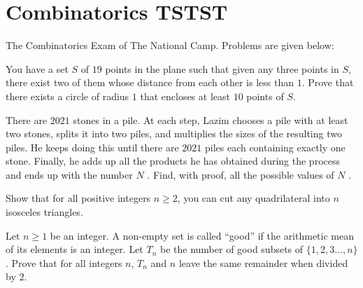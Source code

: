 


\chapter{Combinatorics TSTST}\label{tstst:combi}



%
The Combinatorics Exam of The National Camp.
Problems are given below:

\begin{prob}\label{combi:1}
You have a set $S$ of $19$ points in the plane such that given any three points in $S$, there exist two of them
whose distance from each other is less than $1$. Prove that there exists a circle of radius $1$ that encloses
at least $10$ points of $S$.
	\begin{hint}
	\addhint{}
	\end{hint}
\end{prob}

\begin{prob}\label{combi:2}
There are $2021$ stones in a pile. At each step, Lazim chooses a pile with at least two stones, splits it into
two piles, and multiplies the sizes of the resulting two piles. He keeps doing this until there are $2021$
piles each containing exactly one stone. Finally, he adds up all the products he has obtained during the
process and ends up with the number $N$ . Find, with proof, all the possible values of $N$ .
	\begin{hint}
	\addhint{}
	\addhint{}
	\end{hint}
\end{prob}

\begin{prob}\label{combi:3}
Show that for all positive integers $n\ge 2$, you can cut any quadrilateral into $n$ isosceles triangles.
	\begin{hint}
	\addhint{Induction!}
	\addhint{}
	\end{hint}
\end{prob}

\begin{prob}\label{combi:4}
Let $n \ge 1$ be an integer. A non-empty set is called “good” if the arithmetic mean of its elements is an
integer. Let $T_n$ be the number of good subsets of $\{1, 2, 3 \ldots , n\}$. Prove that for all integers $n$, $T_n$ and $n$
leave the same remainder when divided by $2$.
	\begin{hint}
	\addhint{}
	\addhint{}
	\end{hint}
\end{prob}

